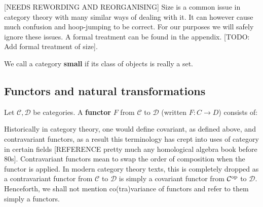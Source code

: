 [NEEDS REWORDING AND REORGANISING]
Size is a common issue in category theory with many similar ways of dealing with it. It can however cause much confusion and hoop-jumping to be correct. For our purposes we will safely ignore these issues. A formal treatment can be found in the appendix. [TODO: Add formal treatment of size].

\begin{defin}
	We call a category {\bf small} if its class of objects is really a set.
\end{defin}

\subsection{Functors and natural transformations}

\begin{defin}
	Let $\mathcal{C},\mathcal{D}$ be categories. A {\bf functor} $F$ from $\mathcal{C}$ to $\mathcal{D}$ (written $F : C \to D$) consists of:
	
	\begin{itemize}
		\item An object $F(A)\in \mathcal{D}$, for all $A \in \mathcal{C}$ (also denoted $FA$).
		\item For each $A,B \in \mathcal{C}$, a function $F_{A,B} : \mathcal{C}}(A,B) \to \mathcal{D}(FA,FB)$ (also denoted $F$).
		\item For each $A \in \mathcal{C}$, $F(1_A) = 1_{FA}$.
		\item For each $A,B,C \in \mathcal{C}$, $f : A \to B$, $g : B \to C$, we have $$F(g \circ f) = F(g)\circ F(f)$$
	\end{itemize}
\end{defin}

\begin{remark}
    Historically in category theory, one would define covariant, as defined above, and contravariant functors, as a result this terminology has crept into uses of category in certain fields [REFERENCE pretty much any homological algebra book before 80s]. Contravariant functors mean to swap the order of composition when the functor is applied. In modern category theory texts, this is completely dropped as a contravariant functor from $\mathcal{C}$ to $\mathcal{D}$ is simply a covariant functor from $\mathcal{C}^{\text{op}}$ to $\mathcal{D}$. Henceforth, we shall not mention co(tra)variance of functors and refer to them simply a functors.
\end{remark}

